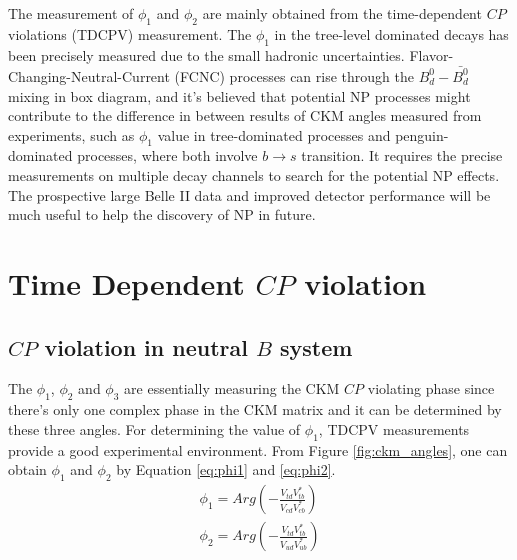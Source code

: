 The measurement of $\phi_1$ and $\phi_2$ are mainly obtained from the time-dependent $CP$ violations (TDCPV) measurement. The $\phi_1$ in the tree-level dominated decays has been precisely measured due to the small hadronic uncertainties. Flavor-Changing-Neutral-Current (FCNC) processes can rise through the $B^0_d-\bar{B^0_d}$ mixing in box diagram, and it's believed that potential NP processes might contribute to the difference in between results of CKM angles measured from experiments, such as $\phi_1$ value in tree-dominated processes and penguin-dominated processes, where both involve $b\to s$ transition. It requires the precise measurements on multiple decay channels to search for the potential NP effects. The prospective large Belle II data and improved detector performance will be much useful to help the discovery of NP in future. 

\section{Time Dependent $CP$ violation}
\subsection{ $CP$ violation in neutral $B$ system}
The  $\phi_1$, $\phi_2$ and $\phi_3$ are essentially measuring the CKM $CP$ violating phase since there's only one complex phase in the CKM matrix and it can be determined by these three angles. 
For determining the value of $\phi_1$, TDCPV measurements provide a good experimental environment.  
From Figure \ref{fig:ckm_angles}, one can obtain $\phi_1$ and $\phi_2$ by Equation \ref{eq:phi1} and \ref{eq:phi2}.
\begin{eqnarray}
\phi_1=Arg(-\frac{V_{td}V^*_{tb}}{V_{cd}V^*_{cb}}) \label{eq:phi1}\\
\phi_2=Arg(-\frac{V_{td}V^*_{tb}}{V_{ud}V^*_{ub}})\label{eq:phi2}
\end{eqnarray}

